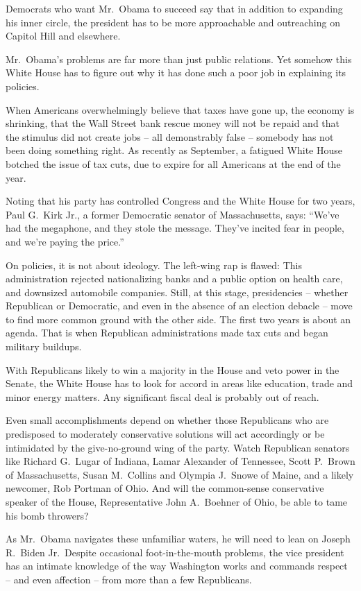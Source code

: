 ﻿\documentclass[12pt]{article}
\begin{document}
Democrats who want Mr.~Obama to succeed say that in addition to expanding his inner circle, the
president has to be more approachable and outreaching on Capitol Hill and elsewhere.

Mr.~Obama's problems are far more than just public relations. Yet somehow this White House has to
figure out why it has done such a poor job in explaining its policies.

When Americans overwhelmingly believe that taxes have gone up, the economy is shrinking, that the
Wall Street bank rescue money will not be repaid and that the stimulus did not create jobs -- all
demonstrably false -- somebody has not been doing something right. As recently as September, a
fatigued White House botched the issue of tax cuts, due to expire for all Americans at the end of
the year.

Noting that his party has controlled Congress and the White House for two years, Paul G.~Kirk Jr., a
former Democratic senator of Massachusetts, says: ``We've had the megaphone, and they stole the
message. They've incited fear in people, and we're paying the price.''

On policies, it is not about ideology. The left-wing rap is flawed: This administration rejected
nationalizing banks and a public option on health care, and downsized automobile companies. Still,
at this stage, presidencies -- whether Republican or Democratic, and even in the absence of an
election debacle -- move to find more common ground with the other side. The first two years is
about an agenda. That is when Republican administrations made tax cuts and began military buildups.

With Republicans likely to win a majority in the House and veto power in the Senate, the White House
has to look for accord in areas like education, trade and minor energy matters. Any significant
fiscal deal is probably out of reach.

Even small accomplishments depend on whether those Republicans who are predisposed to moderately
conservative solutions will act accordingly or be intimidated by the give-no-ground wing of the
party. Watch Republican senators like Richard G.~Lugar of Indiana, Lamar Alexander of Tennessee,
Scott P.~Brown of Massachusetts, Susan M.~Collins and Olympia J.~Snowe of Maine, and a likely
newcomer, Rob Portman of Ohio. And will the common-sense conservative speaker of the House,
Representative John A.~Boehner of Ohio, be able to tame his bomb throwers?

As Mr.~Obama navigates these unfamiliar waters, he will need to lean on Joseph R.~Biden Jr.~Despite
occasional foot-in-the-mouth problems, the vice president has an intimate knowledge of the way
Washington works and commands respect -- and even affection -- from more than a few Republicans.
\end{document}
